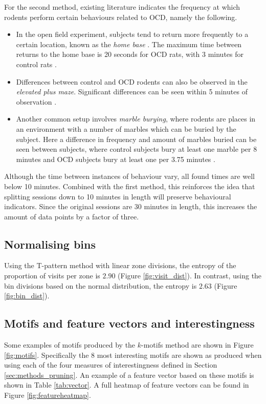 \documentclass[conference,a4paper,twoside]{IEEEtran}
\begin{document}
For the second method, existing literature indicates the frequency at which rodents perform certain behaviours related to OCD, namely the following.

\begin{itemize}
    \item In the open field experiment, subjects tend to return more frequently to a certain location, known as the \emph{home base} \cite{eilam1989home}. The maximum time between returns to the home base is 20 seconds for OCD rats, with 3 minutes for control rats \cite{szechtman2001compulsive}.
    \item Differences between control and OCD rodents can also be observed in the \emph{elevated plus maze}. Significant differences can be seen within 5 minutes of observation \cite{sesia2013evaluation}.
    \item Another common setup involves \emph{marble burying}, where rodents are places in an environment with a number of marbles which can be buried by the subject. Here a difference in frequency and amount of marbles buried can be seen between subjects, where control subjects bury at least one marble per 8 minutes and OCD subjects bury at least one per 3.75 minutes \cite{shmelkov2010slitrk5}.
\end{itemize}

Although the time between instances of behaviour vary, all found times are well below 10 minutes. Combined with the first method, this reinforces the idea that splitting sessions down to 10 minutes in length will preserve behavioural indicators. Since the original sessions are 30 minutes in length, this increases the amount of data points by a factor of three.

\subsection{Normalising bins}
Using the T-pattern method with linear zone divisions, the entropy of the proportion of visits per zone is $2.90$ (Figure \ref{fig:visit_dist}). In contrast, using the bin divisions based on the normal distribution, the entropy is $2.63$ (Figure \ref{fig:bin_dist}).

\subsection{Motifs and feature vectors and interestingness}
Some examples of motifs produced by the $k$-motifs method are shown in Figure \ref{fig:motifs}. Specifically the 8 most interesting motifs are shown as produced when using each of the four measures of interestingness defined in Section \ref{sec:methods_pruning}. An example of a feature vector based on these motifs is shown in Table \ref{tab:vector}. A full heatmap of feature vectors can be found in Figure \ref{fig:featureheatmap}.
\end{document}
